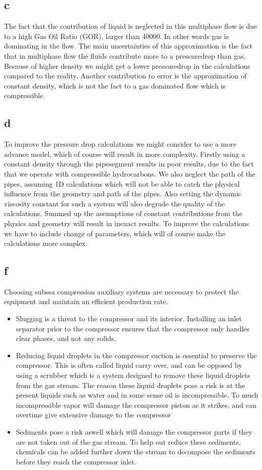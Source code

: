 \documentclass[a4paper,norsk]{article}
\begin{document}
\subsection*{c}
The fact that the contribution of liquid is neglected in this multiphase flow is due to a high Gas Oil Ratio (GOR), larger than 40000. In other words gas is dominating in the flow. The main uncertainties of this approximation is the fact that in multiphase flow the fluids contribute more to a pressuredrop  than gas. Because of higher density we might get a lower pressuredrop in the calculations compared to the reality. Another contribution to error is the approximation of constant density, which is not the fact to a gas dominated flow which is compressible.

\subsection*{d}
To improve the pressure drop calculations we might consider to use a more advance model, which of course will result in more complexity. Firstly using a constant density through the pipesegment results in poor results, due to the fact that we operate with compressible hydrocarbons. We also neglect the path of the pipes, assuming 1D calculations which will not be able to catch the physical influence from the geometry and path of the pipes. Also setting the dynamic viscosity constant for such a system will also degrade the quality of the calculations. Summed up the assumptions of constant contributions from the physics and geometry will result in inexact results. To improve the calculations we have to include change of parameters, which will of course make the calculations more complex. 

\subsection*{f}
Choosing subsea compression auxiliary systems are necessary to protect the equipment and maintain an efficient production rate.
\begin{itemize}
\item Slugging is a threat to the compressor and its interior. Installing an inlet separator prior to the compressor ensures that the compressor only handles clear phases, and not any solids.
\item Reducing liquid droplets in the compressor suction is essential to preserve the compressor. This is often called liquid carry over, and can be opposed by using a scrubber which is a system designed to remove these liquid droplets from the gas stream.
The reason these liquid droplets pose a risk is at the present liquids such as water and in some sense oil is incompressible. To much incompressible vapor will damage the compressor piston as it strikes, and can overtime give extensive damage to the compressor
\item Sediments pose a risk aswell which will damage the compressor parts if they are not taken out of the gas stream. To help out reduce these sediments, chemicals can be added further down the stream to decompose the sediments before they reach the compressor inlet.
\end{itemize}
\end{document}
